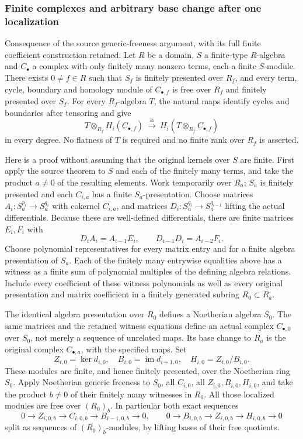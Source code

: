 \subsubsection{Finite complexes and arbitrary base change after one localization}\label{algebra-proof-027-finite-complexes-and-arbitrary-base-change-after-one-localization}

Consequence of the source generic-freeness argument, with its full finite coefficient construction retained. Let \(R\) be a domain, \(S\) a finite-type \(R\)-algebra and \(C_\bullet\) a complex with only finitely many nonzero terms, each a finite \(S\)-module. There exists \(0\ne f\in R\) such that \(S_f\) is finitely presented over \(R_f\), and every term, cycle, boundary and homology module of \(C_{\bullet,f}\) is free over \(R_f\) and finitely presented over \(S_f\). For every \(R_f\)-algebra \(T\), the natural maps identify cycles and boundaries after tensoring and give \[
 T\otimes_{R_f}H_i(C_{\bullet,f})
 \ \xrightarrow{\ \cong\ }\
 H_i(T\otimes_{R_f}C_{\bullet,f})
\] in every degree. No flatness of \(T\) is required and no finite rank over \(R_f\) is asserted.

Here is a proof without assuming that the original kernels over \(S\) are finite. First apply the source theorem to \(S\) and each of the finitely many terms, and take the product \(a\ne0\) of the resulting elements. Work temporarily over \(R_a\); \(S_a\) is finitely presented and each \(C_{i,a}\) has a finite \(S_a\)-presentation. Choose matrices \(A_i:S_a^{p_i}\to S_a^{q_i}\) with cokernel \(C_{i,a}\), and matrices \(D_i:S_a^{q_i}\to S_a^{q_{i-1}}\) lifting the actual differentials. Because these are well-defined differentials, there are finite matrices \(E_i,F_i\) with \[
 D_i A_i=A_{i-1}E_i,\qquad
 D_{i-1}D_i=A_{i-2}F_i.
\] Choose polynomial representatives for every matrix entry and for a finite algebra presentation of \(S_a\). Each of the finitely many entrywise equalities above has a witness as a finite sum of polynomial multiples of the defining algebra relations. Include every coefficient of these witness polynomials as well as every original presentation and matrix coefficient in a finitely generated subring \(R_0\subset R_a\).

The identical algebra presentation over \(R_0\) defines a Noetherian algebra \(S_0\). The same matrices and the retained witness equations define an actual complex \(C_{\bullet,0}\) over \(S_0\), not merely a sequence of unrelated maps. Its base change to \(R_a\) is the original complex \(C_{\bullet,a}\), with the specified maps. Set \[
 Z_{i,0}=\ker d_{i,0},\quad B_{i,0}=\operatorname{im}d_{i+1,0},
 \quad H_{i,0}=Z_{i,0}/B_{i,0}.
\] These modules are finite, and hence finitely presented, over the Noetherian ring \(S_0\). Apply Noetherian generic freeness to \(S_0\), all \(C_{i,0}\), all \(Z_{i,0},B_{i,0},H_{i,0}\), and take the product \(b\ne0\) of their finitely many witnesses in \(R_0\). All those localized modules are free over \((R_0)_b\). In particular both exact sequences \[
 0\to Z_{i,0,b}\to C_{i,0,b}\to B_{i-1,0,b}\to0,\qquad
 0\to B_{i,0,b}\to Z_{i,0,b}\to H_{i,0,b}\to0
\] split as sequences of \((R_0)_b\)-modules, by lifting bases of their free quotients.

